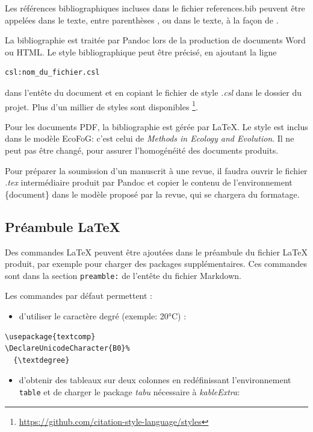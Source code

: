 \documentclass[fleqn,10pt]{ArtEcoFoG} %
\providecommand{\tightlist}{%
  \setlength{\itemsep}{0pt}\setlength{\parskip}{0pt}}
\begin{document}
Les références bibliographiques incluses dans le fichier references.bib peuvent être appelées dans le texte, entre parenthèses \citep{Marcon2014c}, ou dans le texte, à la façon de \citet{Marcon2014c}.

La bibliographie est traitée par Pandoc lors de la production de documents Word ou HTML.
Le style bibliographique peut être précisé, en ajoutant la ligne

\begin{verbatim}
csl:nom_du_fichier.csl
\end{verbatim}

dans l'entête du document et en copiant le fichier de style \emph{.csl} dans le dossier du projet.
Plus d'un millier de styles sont disponibles \footnote{\url{https://github.com/citation-style-language/styles}}.

Pour les documents PDF, la bibliographie est gérée par LaTeX.
Le style est inclus dans le modèle EcoFoG: c'est celui de \emph{Methods in Ecology and Evolution}.
Il ne peut pas être changé, pour assurer l'homogénéité des documents produits.

Pour préparer la soumission d'un manuscrit à une revue, il faudra ouvrir le fichier \emph{.tex} intermédiaire produit par Pandoc et copier le contenu de l'environnement \{document\} dans le modèle proposé par la revue, qui se chargera du formatage.

\hypertarget{pruxe9ambule-latex}{%
\subsection{Préambule LaTeX}\label{pruxe9ambule-latex}}

Des commandes LaTeX peuvent être ajoutées dans le préambule du fichier LaTeX produit, par exemple pour charger des packages supplémentaires.
Ces commandes sont dans la section \texttt{preamble:} de l'entête du fichier Markdown.

Les commandes par défaut permettent :

\begin{itemize}
\tightlist
\item
  d'utiliser le caractère degré (exemple: 20°C) :
\end{itemize}

\begin{verbatim}
\usepackage{textcomp}
\DeclareUnicodeCharacter{B0}%
  {\textdegree}
\end{verbatim}

\begin{itemize}
\tightlist
\item
  d'obtenir des tableaux sur deux colonnes en redéfinissant l'environnement \texttt{table} et de charger le package \emph{tabu} nécessaire à \emph{kableExtra}:
\end{itemize}
\end{document}
